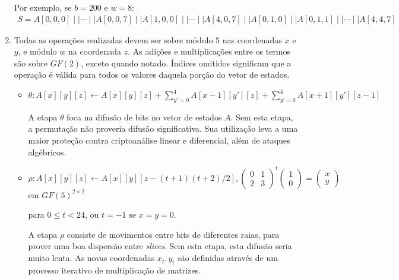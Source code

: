 \documentclass{article}
\begin{document}
\begin{enumerate}[label=(\alph*)]
Por exemplo, se $b = 200$ e $w = 8$:
\begin{align*}
S = A[0, 0, 0] \mid\mid \cdots \mid\mid A[0, 0, 7] \mid\mid A[1, 0, 0]
\mid\mid \cdots \mid\mid A[4, 0, 7] \mid\mid A[0, 1, 0] \mid\mid A[0, 1, 1]
\mid\mid \cdots \mid\mid A[4, 4, 7]
\end{align*}

\item Todas as operações realizadas devem ser sobre módulo 5 nas coordenadas
$x$ e $y$, e módulo $w$ na coordenada $z$. As adições e multiplicações entre
os termos são sobre $GF(2)$, exceto quando notado. Índices omitidos significam
que a operação é válida para todos os valores daquela porção do vetor de
estados.

\begin{itemize}

\item $\theta : A[x][y][z] \longleftarrow A[x][y][z]
    + \displaystyle\sum_{y'=0}^{4} A[x - 1][y'][z]
    + \displaystyle\sum_{y'=0}^{4} A[x + 1][y'][z - 1]$

A etapa $\theta$ foca na difusão de bits no vetor de estados $A$. Sem esta
etapa, a permutação não proveria difusão significativa. Sua utilização leva a
uma maior proteção contra criptoanálise linear e diferencial, além de ataques
algébricos.

\item $\rho : A[x][y][z] \longleftarrow A[x][y][z - (t + 1)(t + 2)/2],
    \begin{pmatrix} 0 & 1 \\ 2 & 3 \end{pmatrix} ^{t}
    \begin{pmatrix} 1 \\ 0 \end{pmatrix}
    = \begin{pmatrix} x \\ y \end{pmatrix} $ em $GF(5)^{2 \times 2}$
    \begin{flushright}
        para $0 \leq t < 24$, ou $t = -1$ se $x = y = 0$.
    \end{flushright}

A etapa $\rho$ consiste de movimentos entre bits de diferentes raias, para
prover uma boa dispersão entre \emph{slices}. Sem esta etapa, esta difusão
seria muito lenta. As novas coordenadas $x_t, y_t$ são definidas através de um
processo iterativo de multiplicação de matrizes.


\end{itemize}
\end{enumerate}
\end{document}
